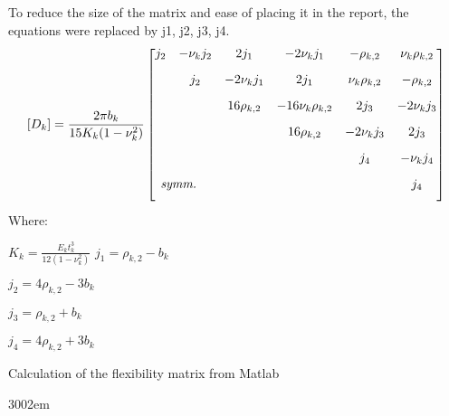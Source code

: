 To reduce the size of the matrix and ease of placing it in the report, the equations were replaced
by j1, j2, j3, j4.
\begin{equation}\label{eqn:flexMatrix}
  [D_k]=\frac{2\pi b_k}{15K_k(1-\nu_k^2)}
  \begin{bmatrix}
        j_2 & -\nu_kj_2 & 2j_1 & -2\nu_kj_1 & -\rho_{k,2} & \nu_k\rho_{k,2} \\[2ex]
            & j_2 & -2\nu_kj_1 & 2j_1 & \nu_k\rho_{k,2} & -\rho_{k,2} \\[2ex]
            &  & 16\rho_{k,2} & -16\nu_k\rho_{k,2} & 2j_3 & -2\nu_kj_3 \\[2ex]
            &  &  & 16\rho_{k,2} & -2\nu_kj_3 & 2j_3 \\[2ex]
            &  &  &  & j_4 & -\nu_kj_4 \\[2ex]
      \rlap{\textit{symm.}} &  &  &  &  & j_4 \\[2ex]
    \end{bmatrix}
\end{equation}
Where:\par
$K_k=\frac{E_kt_k^3}{12(1-\nu_k^2)}$
$j_1=\rho_{k,2}-b_k$\par
$j_2=4\rho_{k,2}-3b_k$\par
$j_3=\rho_{k,2}+b_k$\par
$j_4=4\rho_{k,2}+3b_k$\par
\smallskip
Calculation of the flexibility matrix from Matlab\par
\begin{xtolerant}{300}{2em}
  {\noindent \footnotesize } 
  \end{xtolerant}